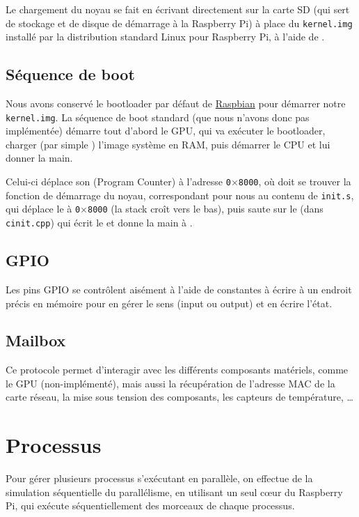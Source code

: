 \documentclass[11pt,a4paper]{article}
\newcommand{\hex}[1]{\texttt{0$\times$#1}}
\newcommand{\fname}[1]{\texttt{#1}} %
\begin{document}
Le chargement du noyau se fait en écrivant directement sur la carte SD
(qui sert de stockage et de disque de démarrage à la Raspberry Pi) à place
du \fname{kernel.img} installé par la distribution standard Linux pour
Raspberry Pi, à l'aide de .

\subsection{Séquence de boot}
Nous avons conservé le bootloader par défaut de
\href{https://www.raspberrypi.org/downloads/raspbian/}{Raspbian} pour démarrer
notre \fname{kernel.img}. La séquence de boot standard (que nous n'avons donc
pas implémentée) démarre tout d'abord le GPU, qui va exécuter le bootloader,
charger (par simple ) l'image système en RAM, puis démarrer le
CPU et lui donner la main.

Celui-ci déplace son  (Program Counter) à l'adresse \hex{8000},
où doit se trouver la fonction de démarrage du noyau, correspondant pour nous
au contenu de \fname{init.s}, qui déplace le  à \hex{8000} (la stack
croît vers le bas), puis saute sur le  (dans \fname{cinit.cpp})
qui écrit le  et donne la main à .

\subsection{GPIO}
Les pins GPIO se contrôlent aisément à l'aide de constantes à écrire à un
endroit précis en mémoire pour en gérer le sens (input ou output) et en écrire
l'état.

\subsection{Mailbox}
Ce protocole permet d'interagir avec les différents composants matériels,
comme le GPU (non-implémenté), mais aussi la récupération de l'adresse MAC
de la carte réseau, la mise sous tension des composants, les capteurs de
température, \ldots

\section{Processus}

Pour gérer plusieurs processus s'exécutant en parallèle, on effectue
de la simulation séquentielle du parallélisme, en utilisant un seul
cœur du Raspberry Pi, qui exécute séquentiellement des morceaux de
chaque processus.
\end{document}
